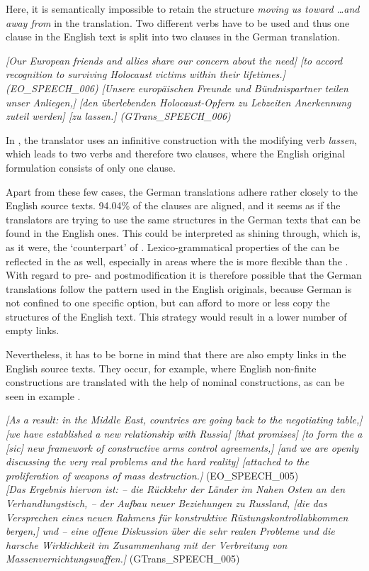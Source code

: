 \documentclass[output=paper]{LSP/langsci}
\begin{document}
 
\newpage 
Here, it is semantically impossible to retain the structure \textit{moving us toward \ldots and away from} in the translation. Two different verbs have to be used and thus one clause in the English text is split into two clauses in the German translation.

\ea \label{ex:culo:17}
   \ea \textit{[Our European friends and allies share our concern about the need] [to accord recognition to surviving Holocaust victims within their lifetimes.] \textup{(EO\_SPEECH\_006)} }
    \ex \textit{[Unsere europäischen Freunde und Bündnispartner teilen unser Anliegen,] [den   überlebenden Holocaust-Opfern zu Lebzeiten Anerkennung zuteil werden] [zu lassen.] \textup{(GTrans\_SPEECH\_006)}}
    \z
\z

In , the translator uses an infinitive construction with the modifying verb \textit{lassen}, which leads to two verbs and therefore two clauses, where the English original formulation consists of only one clause. 

Apart from these few cases, the German translations adhere rather closely to the English source texts. 94.04\% of the clauses are aligned, and it seems as if the translators are trying to use the same structures in the German texts that can be found in the English ones. This could be interpreted as  shining through, which is, as it were, the `counterpart' of . Lexico-grammatical properties of the  can be reflected in the  as well, especially in areas where the  is more flexible than the  \citep[218]{Teich2003}. With regard to pre- and postmodification it is therefore possible that the German translations follow the pattern used in the English originals, because German is not confined to one specific option, but can afford to more or less copy the structures of the English text. This strategy would result in a lower number of empty links. 

Nevertheless, it has to be borne in mind that there are also empty links in the English source texts. They occur, for example, where English non-finite constructions are translated with the help of nominal constructions, as can be seen in example . 

\ea \label{ex:culo:18}
   \ea 
   \textit{[As a result: in the Middle East, countries are going back to the negotiating table,] [we have established a new relationship with Russia] [that promises] [to form the a [\textup{sic}] new framework of constructive arms control agreements,] [and we are openly   discussing the very real problems and the hard reality] [attached to the proliferation of   weapons of mass destruction.]} \textup{(EO\_SPEECH\_005)}\\
   \ex \textit{[Das Ergebnis hiervon ist: -- die Rückkehr der Länder im Nahen Osten an den Verhandlungstisch, -- der Aufbau neuer Beziehungen zu Russland, [die das Versprechen eines neuen Rahmens für konstruktive Rüstungskontrollabkommen bergen,] und -- eine offene Diskussion über die sehr realen Probleme und die harsche Wirklichkeit im   Zusammenhang mit der Verbreitung von Massenvernichtungswaffen.]}  (GTrans\_SPEECH\_005)
   \z
\z
\end{document}
